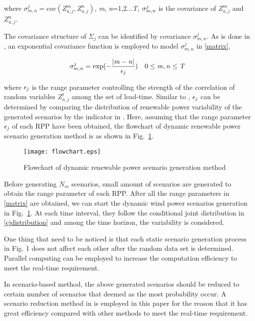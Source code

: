 \noindent where $\sigma_{m,n}^{j}=cov(Z_{a,j}^{m},Z_{a,j}^{n})$, {\it m}, {\it n}=1,2...{\it T}, $\sigma_{{\it m}, {\it n}}^{j}$ is the covariance of $Z_{a,j}^{m}$ and $Z_{a,j}^{n}$.

The covariance structure of $\Sigma_j$ can be identified by covariance $\sigma_{m,n}^{j}$. As is done in \cite{sce_generation_Ma}\cite{sce_generation_Pinson}, an exponential covariance function is employed to model $\sigma_{m,n}^{j}$ in \eqref{matrix},

\begin{equation} \label{exponential}
\begin{aligned}
\sigma_{m,n}^{j}=\rm exp(-\frac{|{\it m}-{\it n}|}{\epsilon_{\it j}}) \quad 0 \le {\it m},  {\it n} \le {\it T}
\end{aligned}
\end{equation}

\noindent where $\epsilon_{\it j}$ is the range parameter controlling the strength of the
correlation of random variables $Z_{a,j}^{t}$ among the set of lead-time. Similar to \cite{sce_generation_Ma}, $\epsilon_{\it j}$ can be determined by comparing the distribution of renewable power variability of the generated scenarios by the indicator in \cite{sce_generation_Ma}. Here, assuming that the  range parameter $\epsilon_{\it j}$ of each RPP have been obtained, the flowchart of dynamic renewable power scenario generation method is as shown in Fig.~\ref{flowchart}.

\begin{figure}[!htb]
	\begin{center}
		\texttt{[image: flowchart.eps]}\\
		\caption{Flowchart of dynamic renewable power scenario generation method}\label{flowchart}
	\end{center}
\end{figure}

Before generating $N_{sc}$ scenarios, small amount of scenarios are generated to obtain the range parameter of each RPP. After all the range parameters in \eqref{matrix} are obtained, we can start the dynamic wind power scenarios generation in Fig.~\ref{flowchart}. At each time interval, they follow the conditional joint distribution in \eqref{cjdistribution} and among the time horizon, the variability is considered.

One thing that need to be noticed is that each static scenario generation process in Fig. 1 does not affect each other after the random data set is determined. Parallel computing can be employed to increase the computation efficiency to meet the real-time requirement.

In scenario-based method, the above generated scenarios should be reduced to certain number of scenarios that deemed as the most probability occur. A scenario reduction method in \cite{YishenWang} is employed in this paper for the reason that it has great efficiency compared with other methods to meet the real-time requirement.
